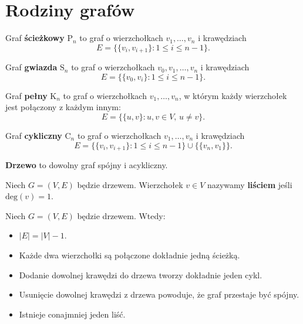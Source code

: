 \section{Rodziny grafów}

\begin{definition}
Graf \textbf{ścieżkowy} $\mathrm{P}_n$ to graf o wierzchołkach $v_1, \dots, v_n$ i krawędziach
\[
E = \{\{v_i, v_{i+1}\} : 1 \le i \le n-1\}.
\]
\end{definition}

\begin{definition}
Graf \textbf{gwiazda} $\mathrm{S}_n$ to graf o wierzchołkach $v_0, v_1, \dots, v_n$ i krawędziach
\[
E = \{\{v_0, v_{i}\} : 1 \le i \le n-1\}.
\]
\end{definition}

\begin{definition}
Graf \textbf{pełny} $\mathrm{K}_n$ to graf o wierzchołkach $v_1, \dots, v_n$, w którym każdy wierzchołek jest połączony z każdym innym:
\[
E = \{\{u, v\} : u, v \in V,\, u \neq v\}.
\]
\end{definition}

\begin{definition}
Graf \textbf{cykliczny} $\mathrm{C}_n$ to graf o wierzchołkach $v_1, \dots, v_n$ i krawędziach
\[
E = \{\{v_i, v_{i+1}\} : 1 \le i \le n-1\} \cup \{\{v_n, v_1\}\}.
\]
\end{definition}

\begin{definition}
\textbf{Drzewo} to dowolny graf spójny i acykliczny.
\end{definition}

\begin{definition}
    Niech $G=(V,E)$ będzie drzewem. Wierzchołek $v\in V$ nazywamy \textbf{liściem} jeśli $\mathrm{deg}(v)=1$.   
\end{definition}

\begin{fact}\label{F:tree_properties}
Niech $G=(V,E)$ będzie drzewem. Wtedy:
\begin{itemize}
    \item $|E|=|V|-1$.
    \item Każde dwa wierzchołki są połączone dokładnie jedną ścieżką.
    \item Dodanie dowolnej krawędzi do drzewa tworzy dokładnie jeden cykl.
    \item Usunięcie dowolnej krawędzi z drzewa powoduje, że graf przestaje być spójny.
    \item Istnieje conajmniej jeden liść.
\end{itemize}
\end{fact}

